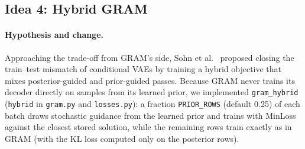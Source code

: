 \documentclass[11pt]{article}
\begin{document}
\subsection{Idea 4: Hybrid GRAM}
\label{sec:idea4}

\paragraph{Hypothesis and change.}
Approaching the trade-off from GRAM's side, Sohn et al.~\cite{sohn2015} proposed closing the train--test mismatch of conditional VAEs by training a hybrid objective that mixes posterior-guided and prior-guided passes. Because GRAM never trains its decoder directly on samples from its learned prior, we implemented \texttt{gram\_hybrid} (\texttt{hybrid} in \texttt{gram.py} and \texttt{losses.py}): a fraction \texttt{PRIOR\_ROWS} (default 0.25) of each batch draws stochastic guidance from the learned prior and trains with MinLoss against the closest stored solution, while the remaining rows train exactly as in GRAM (with the KL loss computed only on the posterior rows).
\end{document}
